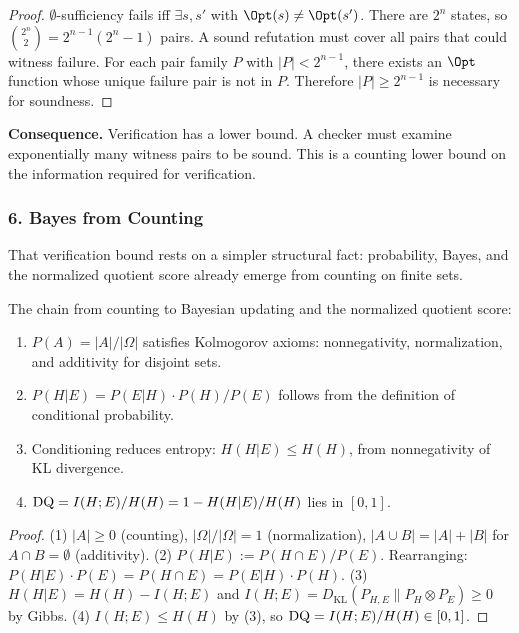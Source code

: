 \begin{proof}
$\emptyset$-sufficiency fails iff $\exists s, s'$ with $\Opt(s) \neq \Opt(s')$. There are $2^n$ states, so $\binom{2^n}{2} = 2^{n-1}(2^n - 1)$ pairs. A sound refutation must cover all pairs that could witness failure. For each pair family $P$ with $|P| < 2^{n-1}$, there exists an $\Opt$ function whose unique failure pair is not in $P$. Therefore $|P| \geq 2^{n-1}$ is necessary for soundness.
\end{proof}

\noindent\textbf{Consequence.} Verification has a lower bound. A checker must examine exponentially many witness pairs to be sound. This is a counting lower bound on the information required for verification.

\subsubsection{6. Bayes from Counting}

That verification bound rests on a simpler structural fact: probability, Bayes, and the normalized quotient score already emerge from counting on finite sets.

\begin{theorem}\label{thm:bayes-from-counting}
The chain from counting to Bayesian updating and the normalized quotient score:
\begin{enumerate}
\item $P(A) = |A|/|\Omega|$ satisfies Kolmogorov axioms: nonnegativity, normalization, and additivity for disjoint sets.
\item $P(H|E) = P(E|H) \cdot P(H) / P(E)$ follows from the definition of conditional probability.
\item Conditioning reduces entropy: $H(H|E) \leq H(H)$, from nonnegativity of KL divergence.
\item $\mathrm{DQ} = I(H;E)/H(H) = 1 - H(H|E)/H(H)$ lies in $[0,1]$.
\end{enumerate}
\end{theorem}

\begin{proof}
(1) $|A| \geq 0$ (counting), $|\Omega|/|\Omega| = 1$ (normalization), $|A \cup B| = |A| + |B|$ for $A \cap B = \emptyset$ (additivity).
(2) $P(H|E) := P(H \cap E)/P(E)$. Rearranging: $P(H|E) \cdot P(E) = P(H \cap E) = P(E|H) \cdot P(H)$.
(3) $H(H|E) = H(H) - I(H;E)$ and $I(H;E) = D_{\mathrm{KL}}(P_{H,E} \| P_H \otimes P_E) \geq 0$ by Gibbs.
(4) $I(H;E) \leq H(H)$ by (3), so $\mathrm{DQ} = I(H;E)/H(H) \in [0,1]$.
\end{proof}

